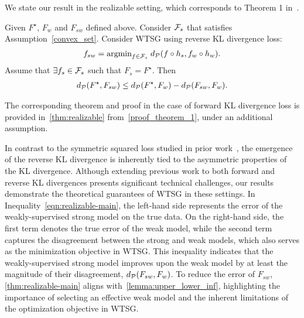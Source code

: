 We state our result in the realizable setting, which corresponds to Theorem 1 in~\citet{charikar2024quantifying}.
\begin{theorem}
\label{thm:realizable-main}

Given $F^\star$, $F_w$ and $F_{sw}$ defined above.
Consider $\mathcal{F}_s$ that satisfies Assumption~\ref{convex_set}. 
Consider WTSG using reverse KL divergence loss:
\begin{align*}
    f_{sw} = \text{argmin}_{f \in \mathcal{F}_{s}}\; d_\mathcal{P}(f \circ h_s, f_w \circ h_w).
\end{align*}
Assume that $\exists f_s \in \mathcal{F}_s$ such that $F_s = F^\star$.
Then
\begin{align} \label{eqn:realizable-main}
    d_\mathcal{P}(F^\star, F_{sw}) \le d_\mathcal{P}(F^\star, F_w) - d_\mathcal{P}(F_{sw}, F_w).
\end{align}
\end{theorem}

\begin{remark}
    The corresponding theorem and proof in the case of forward KL divergence loss is provided in~\cref{thm:realizable} from~\cref{proof_theorem_1}, under an additional assumption.
\end{remark}

In contrast to the symmetric squared loss studied in prior work~\citep{charikar2024quantifying}, the emergence of the reverse KL divergence is inherently tied to the asymmetric properties of the KL divergence.
Although extending previous work to both forward and reverse KL divergences presents significant technical challenges, our results demonstrate the theoretical guarantees of WTSG in these settings.
In Inequality~\eqref{eqn:realizable-main}, the left-hand side represents the error of the weakly-supervised strong model on the true data. 
On the right-hand side, the first term denotes the true error of the weak model, while the second term captures the disagreement between the strong and weak models, which also serves as the minimization objective in WTSG. 
This inequality indicates that the weakly-supervised strong model improves upon the weak model by at least the magnitude of their disagreement, $d_\mathcal{P}(F_{sw}, F_w)$.
To reduce the error of $F_{sw}$, \cref{thm:realizable-main} aligns with~\cref{lemma:upper_lower_inf}, highlighting the importance of selecting an effective weak model and the inherent limitations of the optimization objective in WTSG.













